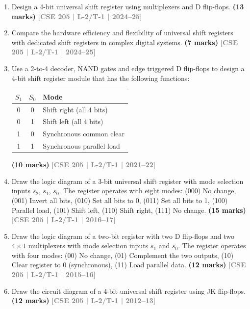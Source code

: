 \documentclass[12pt]{article}
\newcommand{\yr}[1]{\hfill\textcolor{gray}{\small\textbf{[#1]}}}
\newcommand{\mk}[1]{\textcolor{orange!70!black}{\small\textbf{(#1 marks)}}}
\begin{document}
\begin{enumerate}

\item Design a 4-bit universal shift register using multiplexers and D flip-flops.
\mk{13} \yr{CSE 205 | L-2/T-1 | 2024--25}



\item Compare the hardware efficiency and flexibility of universal shift registers with dedicated shift registers in complex digital systems.
\mk{7} \yr{CSE 205 | L-2/T-1 | 2024--25}



\item Use a 2-to-4 decoder, NAND gates and edge triggered D flip-flops to design a 4-bit shift register module that has the following functions:
\begin{center}
\begin{tabular}{|c|c|l|}
\hline
$S_1$ & $S_0$ & Mode \\
\hline
0 & 0 & Shift right (all 4 bits)\\
0 & 1 & Shift left (all 4 bits)\\
1 & 0 & Synchronous common clear \\
1 & 1 & Synchronous parallel load \\
\hline
\end{tabular}
\end{center}
\mk{10} \yr{CSE 205 | L-2/T-1 | 2021--22}



\item Draw the logic diagram of a 3-bit universal shift register with mode selection inputs $s_2$, $s_1$, $s_0$. The register operates with eight modes: (000) No change, (001) Invert all bits, (010) Set all bits to 0, (011) Set all bits to 1, (100) Parallel load, (101) Shift left, (110) Shift right, (111) No change.
\mk{15} \yr{CSE 205 | L-2/T-1 | 2016--17}



\item Draw the logic diagram of a two-bit register with two D flip-flops and two $4\times1$ multiplexers with mode selection inputs $s_1$ and $s_0$. The register operates with four modes: (00) No change, (01) Complement the two outputs, (10) Clear register to 0 (synchronous), (11) Load parallel data.
\mk{12} \yr{CSE 205 | L-2/T-1 | 2015--16}



\item Draw the circuit diagram of a 4-bit universal shift register using JK flip-flops.
\mk{12} \yr{CSE 205 | L-2/T-1 | 2012--13}



\end{enumerate}
\end{document}
